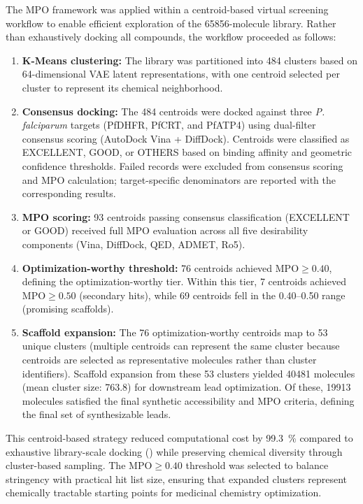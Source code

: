 \documentclass[journal=jcisd8,manuscript=suppinfo]{achemso}
\begin{document}
The MPO framework was applied within a centroid-based virtual screening workflow to enable efficient exploration of the \num{65856}-molecule library. Rather than exhaustively docking all compounds, the workflow proceeded as follows:

\begin{enumerate}
\item \textbf{K-Means clustering:} The library was partitioned into \num{484} clusters based on \num{64}-dimensional VAE latent representations, with one centroid selected per cluster to represent its chemical neighborhood.
\item \textbf{Consensus docking:} The \num{484} centroids were docked against three \textit{P. falciparum} targets (PfDHFR, PfCRT, and PfATP4) using dual-filter consensus scoring (AutoDock Vina + DiffDock). Centroids were classified as EXCELLENT, GOOD, or OTHERS based on binding affinity and geometric confidence thresholds. Failed records were excluded from consensus scoring and MPO calculation; target-specific denominators are reported with the corresponding results.
\item \textbf{MPO scoring:} \num{93} centroids passing consensus classification (EXCELLENT or GOOD) received full MPO evaluation across all five desirability components (Vina, DiffDock, QED, ADMET, Ro5).
\item \textbf{Optimization-worthy threshold:} \num{76} centroids achieved $\text{MPO} \geq \num{0.40}$, defining the optimization-worthy tier. Within this tier, \num{7} centroids achieved $\text{MPO} \geq \num{0.50}$ (secondary hits), while \num{69} centroids fell in the \numrange{0.40}{0.50} range (promising scaffolds).
\item \textbf{Scaffold expansion:} The \num{76} optimization-worthy centroids map to \num{53} unique clusters (multiple centroids can represent the same cluster because centroids are selected as representative molecules rather than cluster identifiers). Scaffold expansion from these \num{53} clusters yielded \num{40481} molecules (mean cluster size: \num{763.8}) for downstream lead optimization. Of these, \num{19913} molecules satisfied the final synthetic accessibility and MPO criteria, defining the final set of synthesizable leads.
\end{enumerate}

This centroid-based strategy reduced computational cost by \qty{99.3}{\percent} compared to exhaustive library-scale docking () while preserving chemical diversity through cluster-based sampling. The $\text{MPO} \geq \num{0.40}$ threshold was selected to balance stringency with practical hit list size, ensuring that expanded clusters represent chemically tractable starting points for medicinal chemistry optimization.
\end{document}
